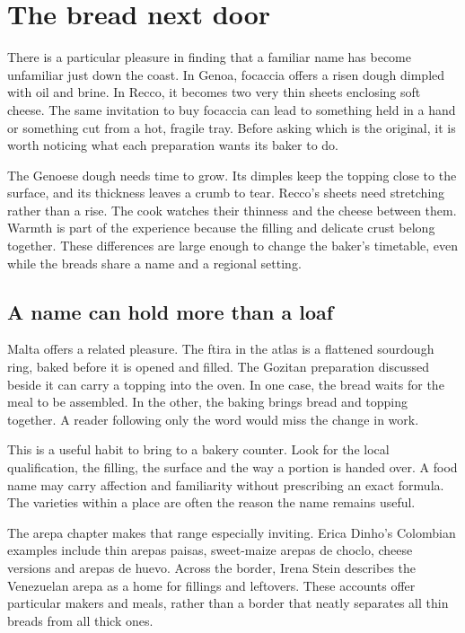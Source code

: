 \chapter{The bread next door}\label{connection:neighbours}

There is a particular pleasure in finding that a familiar name has become unfamiliar just down the coast. In Genoa, focaccia offers a risen dough dimpled with oil and brine. In Recco, it becomes two very thin sheets enclosing soft cheese. The same invitation to buy focaccia can lead to something held in a hand or something cut from a hot, fragile tray. Before asking which is the original, it is worth noticing what each preparation wants its baker to do.\citep{focacciaconsortium,reccofocaccia}

The Genoese dough needs time to grow. Its dimples keep the topping close to the surface, and its thickness leaves a crumb to tear. Recco's sheets need stretching rather than a rise. The cook watches their thinness and the cheese between them. Warmth is part of the experience because the filling and delicate crust belong together. These differences are large enough to change the baker's timetable, even while the breads share a name and a regional setting.

\section{A name can hold more than a loaf}
Malta offers a related pleasure. The ftira in the atlas is a flattened sourdough ring, baked before it is opened and filled. The Gozitan preparation discussed beside it can carry a topping into the oven. In one case, the bread waits for the meal to be assembled. In the other, the baking brings bread and topping together. A reader following only the word would miss the change in work.\citep{ftira,gozoftira}

This is a useful habit to bring to a bakery counter. Look for the local qualification, the filling, the surface and the way a portion is handed over. A food name may carry affection and familiarity without prescribing an exact formula. The varieties within a place are often the reason the name remains useful.

The arepa chapter makes that range especially inviting. Erica Dinho's Colombian examples include thin arepas paisas, sweet-maize arepas de choclo, cheese versions and arepas de huevo. Across the border, Irena Stein describes the Venezuelan arepa as a home for fillings and leftovers. These accounts offer particular makers and meals, rather than a border that neatly separates all thin breads from all thick ones.\citep{dinhoarepavar08,steinarepa08}

